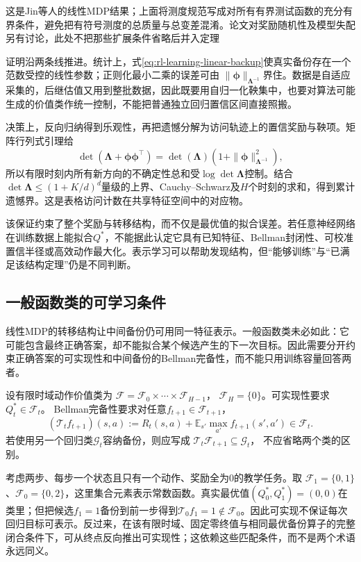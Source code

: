这是Jin等人的线性MDP结果；上面将测度规范写成对所有有界测试函数的充分有界条件，避免把有符号测度的总质量与总变差混淆。论文对奖励随机性及模型失配另有讨论，此处不把那些扩展条件省略后并入定理

证明沿两条线推进。统计上，式\eqref{eq:rl-learning-linear-backup}使真实备份存在一个范数受控的线性参数；正则化最小二乘的误差可由
$\|\bm\phi\|_{\bm\Lambda^{-1}}$界住。数据是自适应采集的，后继估值又用到整批数据，因此既要用自归一化鞅集中，也要对算法可能生成的价值类作统一控制，不能把普通独立回归置信区间直接照搬。

决策上，反向归纳得到乐观性，再把遗憾分解为访问轨迹上的置信奖励与鞅项。矩阵行列式引理给
\[
 \det(\bm\Lambda+\bm\phi\bm\phi^\top)
    =\det(\bm\Lambda)(1+\|\bm\phi\|_{\bm\Lambda^{-1}}^2),
\]
所以有限时刻内所有新方向的不确定性总和受$\log\det\bm\Lambda$控制。结合
$\det\bm\Lambda\leq(1+K/d)^d$量级的上界、Cauchy--Schwarz及$H$个时刻的求和，得到累计遗憾界。这是表格访问计数在共享特征空间中的对应物。

该保证约束了整个奖励与转移结构，而不仅是最优值的拟合误差。若任意神经网络在训练数据上能拟合$Q^*$，不能据此认定它具有已知特征、Bellman封闭性、可校准置信半径或高效动作最大化。表示学习可以帮助发现结构，但“能够训练”与“已满足该结构定理”仍是不同判断。

\subsection{一般函数类的可学习条件}
\label{sec:rl-learning-function-classes}

线性MDP的转移结构让中间备份仍可用同一特征表示。一般函数类未必如此：它可能包含最终正确答案，却不能拟合某个候选产生的下一次目标。因此需要分开约束正确答案的可实现性和中间备份的Bellman完备性，而不能只用训练容量回答两者。

\begin{definition}[可实现性与Bellman完备性]
  \label{def:rl-learning-realizability}
  设有限时域动作价值类为
  $\mathcal F=\mathcal F_0\times\cdots\times\mathcal F_{H-1}$，
  $\mathcal F_H=\{0\}$。可实现性要求$Q_t^*\in\mathcal F_t$。
  Bellman完备性要求对任意$f_{t+1}\in\mathcal F_{t+1}$，
  \[
    (\mathcal T_t f_{t+1})(s,a)
       :=R_t(s,a)+\mathbb E_{s'}\max_{a'}f_{t+1}(s',a')
                  \in\mathcal F_t.
  \]
  若使用另一个回归类$\mathcal G_t$容纳备份，则应写成
  $\mathcal T_t\mathcal F_{t+1}\subseteq\mathcal G_t$，
  不应省略两个类的区别。
\end{definition}

考虑两步、每步一个状态且只有一个动作、奖励全为0的教学任务。取
$\mathcal F_1=\{0,1\}$、$\mathcal F_0=\{0,2\}$，这里集合元素表示常数函数。真实最优值$(Q_0^*,Q_1^*)=(0,0)$在类里；但把候选$f_1=1$备份到前一步得到$\mathcal T_0f_1=1\notin\mathcal F_0$。因此可实现不保证每次回归目标可表示。反过来，在该有限时域、固定零终值与相同最优备份算子的完整闭合条件下，可从终点反向推出可实现性；这依赖这些匹配条件，而不是两个术语永远同义。

